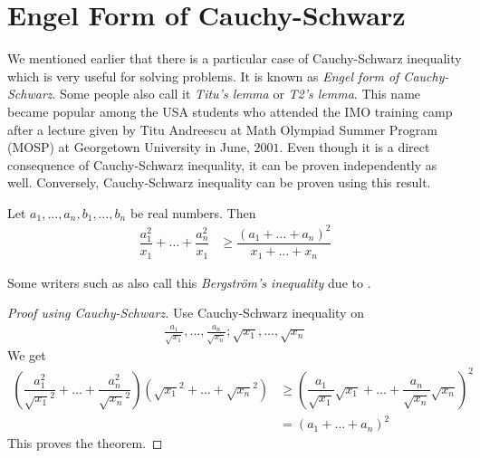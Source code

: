 \documentclass{subfile}
\begin{document}
	\section{Engel Form of Cauchy-Schwarz}\label{sec:engel}
	We mentioned earlier that there is a particular case of Cauchy-Schwarz inequality which is very useful for solving problems. It is known as \emph{Engel form of Cauchy-Schwarz}. Some people also call it \emph{Titu's lemma} or \emph{T2's lemma}. This name became popular among the USA students who attended the IMO training camp after a lecture given by Titu Andreescu at Math Olympiad Summer Program (MOSP) at Georgetown University in June, $2001$. Even though it is a direct consequence of Cauchy-Schwarz inequality, it can be proven independently as well. Conversely, Cauchy-Schwarz inequality can be proven using this result.
		\begin{theorem}\label{thm:engel}
			Let $a_1,\ldots,a_n,b_1,\ldots,b_n$ be real numbers. Then
				\begin{align}
					\dfrac{a_1^2}{x_1}+\ldots+\dfrac{a_n^2}{x_1}
						& \geq\dfrac{(a_1+\ldots+a_n)^2}{x_1+\ldots+x_n}\label{ineq:engel}
				\end{align}
		\end{theorem}
	Some writers such as \textcite{mitrinovitch_1959, bellman_1955} also call this \emph{Bergstr\"{o}m's inequality} due to \textcite{bergstrom_1949}.
		\begin{proof}[Proof using Cauchy-Schwarz]
			Use Cauchy-Schwarz inequality on
				\begin{align*}
					\frac{a_1}{\sqrt{x_1}},\ldots,\frac{a_{n}}{\sqrt{x_{n}}};\sqrt{x_1},\ldots,\sqrt{x_n}
				\end{align*}
			We get
				\begin{align*}
					\left(\dfrac{a_1^2}{\sqrt{x_1}^2}+\ldots+\dfrac{a_n^2}{\sqrt{x_{n}}^2}\right)\left(\sqrt{x_1}^2+\ldots+\sqrt{x_n}^2\right)
						& \geq\left(\dfrac{a_1}{\sqrt{x_1}}\sqrt{x_1}+\ldots+\dfrac{a_n}{\sqrt{x_n}}\sqrt{x_n}\right)^2\\
						& = (a_1+\ldots+a_n)^2
				\end{align*}
			This proves the theorem.
		\end{proof}
\end{document}
